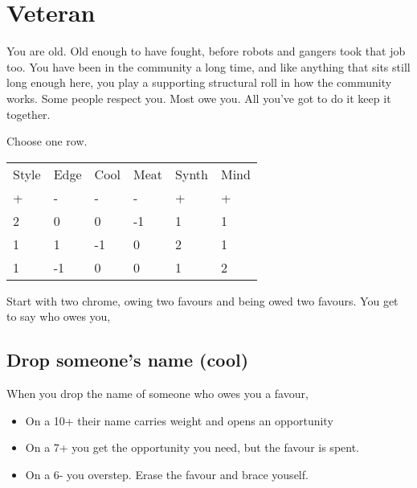 \documentclass{tufte-book}
\begin{document}


\section{Veteran} \label{sec:Veteran}

You are old. Old enough to have fought, before robots and gangers took that job too. You have been in the community a long time, and like anything that sits still long enough here, you play a supporting structural roll in how the community works. Some people respect you. Most owe you. All you've got to do it keep it together.


Choose one row.
\begin{table}[ht]
\centering
{}\selectfont
\begin{tabular}{llllll}
\toprule
Style & Edge & Cool & Meat & Synth & Mind\\
+&-&-&-&+&+\\
\midrule
2&0&0&-1&1&1\\
1&1&-1&0&2&1\\
1&-1&0&0&1&2\\
\bottomrule
\end{tabular}
\end{table}

Start with two chrome, owing two favours and being owed two favours. You get to say who owes you,

\subsection{Drop someone's name (cool)}
When you drop the name of someone who owes you a favour, 
\begin{itemize}
	\item On a 10+ their name carries weight and opens an opportunity
	\item On a 7+ you get the opportunity you need, but the favour is spent.
	\item On a 6- you overstep. Erase the favour and brace youself.
\end{itemize}
\end{document}
